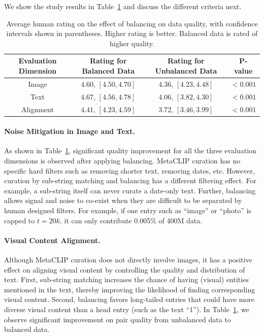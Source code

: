 \documentclass{article} %
\begin{document}
We show the study results in Table~\ref{tab:human_evaluation} and discuss the different criteria next. 

\begin{table}[!htbp]
	\centering
	\begin{tabular}{cccc}
		\toprule
		Evaluation Dimension & Rating for Balanced Data &  Rating for Unbalanced Data & P-value \\
		\midrule
		Image & $4.60$, $[4.50, 4.70]$  & $4.36$, $[4.23, 4.48]$ & $<0.001$ \\
		\midrule
		Text & $4.67$, $[4.56, 4.78]$ & $4.06$, $[3.82, 4.30]$ & $<0.001$ \\
		\midrule
		Alignment & $4.41$, $[4.23, 4.59]$ & $3.72$, $[3.46, 3.99]$ & $<0.001$ \\
		\bottomrule
	\end{tabular}
	\vspace{-5pt}
	\caption{Average human rating on the effect of balancing on data quality, with confidence intervals shown in parentheses. Higher rating is better. Balanced data is rated of higher quality.  }
	\label{tab:human_evaluation}
 \vspace{-10pt}
\end{table}

\paragraph{Noise Mitigation in Image and Text.}
As shown in Table~\ref{tab:human_evaluation}, significant quality improvement for all the three evaluation dimensions is observed after applying  balancing. 
MetaCLIP curation has no specific hard filters such as removing shorter text, removing dates, etc. However, curation by sub-string matching and balancing has a different filtering effect. For example, a sub-string itself can never curate a date-only text.
Further, balancing allows signal and noise to co-exist when they are difficult to be separated by human designed filters.
For example, if one entry such as ``image'' or ``photo'' is capped to $t=20k$, it can only contribute 0.005\% of 400M data.

\paragraph{Visual Content Alignment.}
Although MetaCLIP curation does not directly involve images,
it has a positive effect on aligning visual content by controlling the quality and distribution of text.
First, sub-string matching increases the chance of having (visual) entities mentioned in the text, thereby improving the likelihood of finding corresponding visual content. Second, balancing favors long-tailed entries that could have more diverse visual content than a head entry (such as the text ``1'').
In Table~\ref{tab:human_evaluation}, we observe significant improvement on pair quality from unbalanced data to balanced data. 
\end{document}
